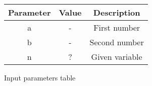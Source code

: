 \centering
\begin{tabular}{|c|c|c|}
        \hline
        \textbf{Parameter} & \textbf{Value} & \textbf{Description} \\
        \hline
        a & - & First number \\
        \hline
        b & - & Second number \\
	\hline
        n & ? & Given variable \\
        \hline
\end{tabular}
\caption{Input parameters table}
\label{tab:1}
